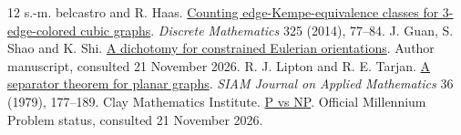 \documentclass[12pt,letterpaper]{article}
\newcommand{\rref}[2]{\href{#1}{#2}}
\begin{document}
\begin{thebibliography}{12}
 s.-m. belcastro and R. Haas. \rref{https://arxiv.org/abs/1209.1730}{Counting edge-Kempe-equivalence classes for 3-edge-colored cubic graphs}. \emph{Discrete Mathematics} 325 (2014), 77--84.
 J. Guan, S. Shao and K. Shi. \rref{https://keshi.pro/files/papers/eo-dichotomy.pdf}{A dichotomy for constrained Eulerian orientations}. Author manuscript, consulted 21 November 2026.
 R. J. Lipton and R. E. Tarjan. \rref{https://www.cs.princeton.edu/courses/archive/fall06/cos528/handouts/sepplanar.pdf}{A separator theorem for planar graphs}. \emph{SIAM Journal on Applied Mathematics} 36 (1979), 177--189.
 Clay Mathematics Institute. \rref{https://www.claymath.org/millennium/p-vs-np/}{P vs NP}. Official Millennium Problem status, consulted 21 November 2026.
\end{thebibliography}\endgroup
\end{document}
